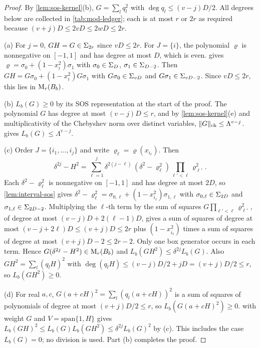 \begin{proof}
By \cref{lem:sos-kernel}(b), $G=\sum_lq_l^2$ with $\deg q_l\le(v-j)D/2$.
All degrees below are collected in \cref{tab:mod-ledger}; each is at most
$r$ or $2r$ as required because $(v+j)D\le2vD\le2wD\le2r$.

(a) For $j=0$, $GH=G\in\Sigma_{2r}$ since $vD\le2r$. For $J=\{i\}$, the
polynomial $\varrho$ is nonnegative on $[-1,1]$ and has degree at most $D$,
which is even.  gives $\varrho=\sigma_0+(1-x_i^2)
\sigma_1$ with $\sigma_0\in\Sigma_D$, $\sigma_1\in\Sigma_{D-2}$. Then
$GH=G\sigma_0+(1-x_i^2)G\sigma_1$ with $G\sigma_0\in\Sigma_{vD}$ and
$G\sigma_1\in\Sigma_{vD-2}$. Since $vD\le2r$, this lies in $\mathrm{M}_r(B_b)$.

(b) $L_b(G)\ge0$ by its SOS representation at the start of the proof. The polynomial $G$ has degree at most
$(v-j)D\le r$, and by \cref{lem:sos-kernel}(e) and multiplicativity of the
Chebyshev norm over distinct variables, $\lVert G\rVert_{\mathrm{ch}}\le\Lambda^{v-j}$.
 gives $L_b(G)\le\Lambda^{v-j}$.

(c) Order $J=\{i_1,\dots,i_j\}$ and write $\varrho_\ell=\varrho(x_{i_\ell})$.
Then
\[
  \delta^{2j}-H^2=\sum_{\ell=1}^j\delta^{2(j-\ell)}\,(\delta^2-\varrho_\ell^2)
  \prod_{\ell'<\ell}\varrho_{\ell'}^2 .
\]
Each $\delta^2-\varrho_\ell^2$ is nonnegative on $[-1,1]$ and has degree
at most $2D$, so \cref{lem:interval-sos} gives
$\delta^2-\varrho_\ell^2=\sigma_{0,\ell}+(1-x_{i_\ell}^2)\sigma_{1,\ell}$
with $\sigma_{0,\ell}\in\Sigma_{2D}$ and $\sigma_{1,\ell}\in\Sigma_{2D-2}$.
Multiplying the $\ell$-th term by the sum of squares
$G\prod_{\ell'<\ell}\varrho_{\ell'}^2$, of degree at most
$(v-j)D+2(\ell-1)D$, gives a sum of squares of degree at most
$(v-j+2\ell)D\le(v+j)D\le2r$ plus $(1-x_{i_\ell}^2)$ times a sum of squares
of degree at most $(v+j)D-2\le2r-2$. Only one box generator occurs in each
term. Hence $G(\delta^{2j}-H^2)\in\mathrm{M}_r(B_b)$ and
$L_b(GH^2)\le\delta^{2j}L_b(G)$. Also $GH^2=\sum_l(q_lH)^2$ with
$\deg(q_lH)\le(v-j)D/2+jD=(v+j)D/2\le r$, so $L_b(GH^2)\ge0$.

(d) For real $a,c$, $G(a+cH)^2=\sum_l(q_l(a+cH))^2$ is a sum of squares of
polynomials of degree at most $(v+j)D/2\le r$, so $L_b(G(a+cH)^2)\ge0$.
 with weight $G$ and $V=\mathrm{span}\{1,H\}$ gives
$L_b(GH)^2\le L_b(G)L_b(GH^2)\le\delta^{2j}L_b(G)^2$ by (c). This includes
the case $L_b(G)=0$; no division is used. Part (b) completes the proof.
\end{proof}

